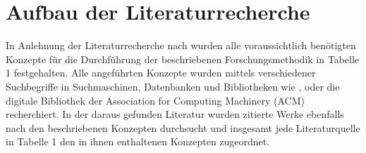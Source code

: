 \section{Aufbau der Literaturrecherche}

In Anlehnung der Literaturrecherche nach \cite[]{10.5555/2017160.2017162} wurden alle voraussichtlich benötigten Konzepte für die Durchführung der beschriebenen Forschungsmethodik in Tabelle 1 festgehalten.
Alle angeführten Konzepte wurden mittels verschiedener Suchbegriffe in Suchmaschinen, Datenbanken und Bibliotheken wie \cite[]{.2282023}, \cite[]{.2282023b} oder die digitale Bibliothek der Association for Computing Machinery (ACM) \cite[]{ACMDigitalLibrary.2282023}  recherchiert.
In der daraus gefunden Literatur wurden zitierte Werke ebenfalls nach den beschriebenen Konzepten durchsucht und insgesamt jede Literaturquelle in Tabelle 1 den in ihnen enthaltenen Konzepten zugeordnet.  
